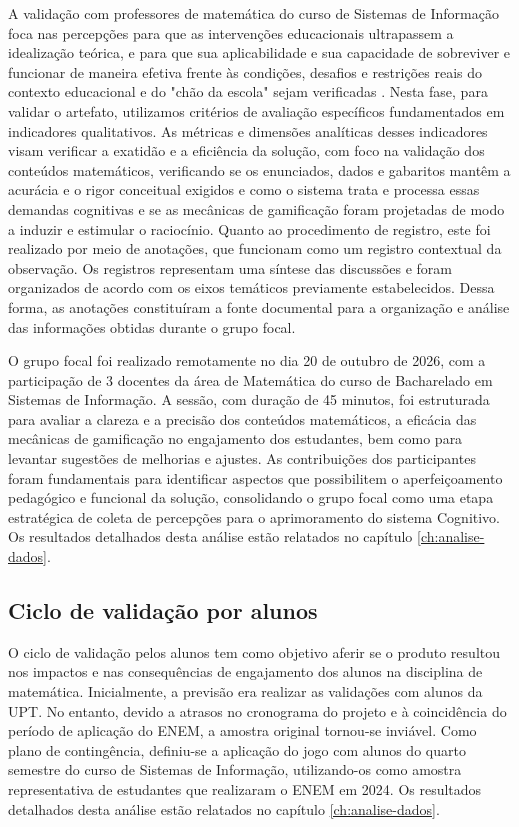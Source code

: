 A validação com professores de matemática do curso de Sistemas de Informação
foca nas percepções para que as intervenções educacionais ultrapassem a idealização teórica, e
para que sua aplicabilidade e sua capacidade de sobreviver e funcionar de maneira efetiva frente
às condições, desafios e restrições reais do contexto educacional e do "chão da escola" sejam
verificadas \cite{plomp2018pesquisa}. Nesta fase, para validar o artefato, utilizamos critérios
de avaliação específicos fundamentados em indicadores qualitativos. As métricas e dimensões
analíticas desses indicadores visam verificar a exatidão e a eficiência da solução, com foco na
validação dos conteúdos matemáticos, verificando se os enunciados, dados e gabaritos mantêm
a acurácia e o rigor conceitual exigidos e como o sistema trata e processa essas demandas
cognitivas e se as mecânicas de gamificação foram projetadas de modo a induzir e estimular o
raciocínio. Quanto ao procedimento de registro, este foi realizado por meio de anotações, que funcionam como um registro contextual da observação. Os registros representam uma síntese das discussões e foram organizados de acordo com os eixos temáticos previamente estabelecidos. Dessa forma, as anotações constituíram a fonte documental para a organização e análise das informações obtidas durante o grupo focal.

O grupo focal foi realizado remotamente no dia 20 de outubro de 2026, com a participação de 3 docentes da área de Matemática do curso de Bacharelado em Sistemas de Informação. A sessão, com duração de 45 minutos, foi estruturada para avaliar a clareza e a precisão dos conteúdos matemáticos, a eficácia das mecânicas de gamificação no engajamento dos estudantes, bem como para levantar sugestões de melhorias e ajustes.
As contribuições dos participantes foram fundamentais para identificar aspectos que possibilitem o aperfeiçoamento pedagógico e funcional da solução, consolidando o grupo focal como uma etapa estratégica de coleta de percepções para o aprimoramento do sistema Cognitivo. Os resultados detalhados desta análise estão relatados no capítulo \ref{ch:analise-dados}.


\subsection{Ciclo de validação por alunos}
O ciclo de validação pelos alunos tem como objetivo aferir se o produto
resultou nos impactos e nas consequências de engajamento dos alunos na disciplina
de matemática. Inicialmente, a previsão era realizar as validações com alunos da UPT. No entanto, devido a atrasos no cronograma do projeto e à coincidência do período de aplicação do ENEM, a amostra original tornou-se inviável. Como plano de contingência, definiu-se a aplicação do jogo com alunos do quarto semestre do curso de Sistemas de Informação, utilizando-os como amostra representativa de estudantes que realizaram o ENEM em 2024. Os resultados detalhados desta análise estão relatados no capítulo \ref{ch:analise-dados}.

